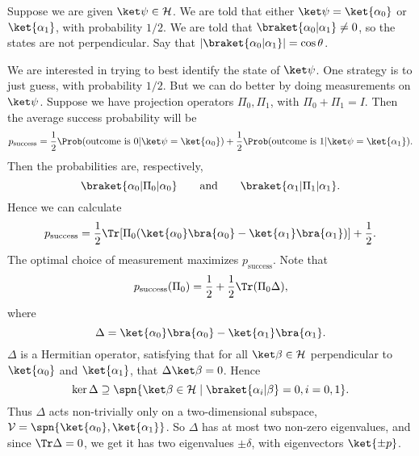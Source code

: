 \documentclass[12pt]{article}
\begin{document}
Suppose we are given $\ket \psi \in \mathcal{H}$. We are told that either $\ket \psi = \ket{\alpha_0}$ or $\ket{\alpha_1}$, with probability $1/2$. We are told that $\braket{\alpha_0|\alpha_1} \neq 0$, so the states are not perpendicular. Say that $|\braket{\alpha_0|\alpha_1}| = \cos \theta$.

We are interested in trying to best identify the state of $\ket \psi$. One strategy is to just guess, with probability $1/2$. But we can do better by doing measurements on $\ket \psi$. Suppose we have projection operators $\Pi_0, \Pi_1$, with $\Pi_0 + \Pi_1 = I$. Then the average success probability will be
\[
	p_{\mathrm{success}} = \frac{1}{2} \Prob(\text{outcome is } 0 | \ket \psi = \ket{\alpha_0}) + \frac{1}{2} \Prob(\text{outcome is } 1 | \ket \psi = \ket{\alpha_1}).
\]
Then the probabilities are, respectively,
\[
	\braket{\alpha_0|\Pi_0|\alpha_0} \qquad \text{and} \qquad \braket{\alpha_1|\Pi_1|\alpha_1}.
\]
Hence we can calculate
\[
	p_{\mathrm{success}} = \frac{1}{2} \Tr[\Pi_0(\ket{\alpha_0} \bra{\alpha_0} - \ket{\alpha_1} \bra{\alpha_1})] + \frac{1}{2}.
\]
The optimal choice of measurement maximizes $p_{\mathrm{success}}$. Note that
\[
p_{\mathrm{success}}(\Pi_0) = \frac{1}{2} + \frac{1}{2} \Tr(\Pi_0 \Delta),
\]
where
\[
	\Delta = \ket{\alpha_0}\bra{\alpha_0} - \ket{\alpha_1}\bra{\alpha_1}.
\]
$\Delta$ is a Hermitian operator, satisfying that for all $\ket \beta \in \mathcal{H}$ perpendicular to $\ket{\alpha_0}$ and $\ket{\alpha_1}$, that $\Delta \ket \beta = 0$. Hence
\[
	\ker \Delta \supseteq \spn\{\ket \beta \in \mathcal{H} \mid \braket{\alpha_i|\beta} = 0, i = 0, 1\}.
\]
Thus $\Delta$ acts non-trivially only on a two-dimensional subspace, $\mathcal{V} = \spn\{\ket{\alpha_0}, \ket{\alpha_1}\}$. So $\Delta$ has at most two non-zero eigenvalues, and since $\Tr \Delta = 0$, we get it has two eigenvalues $\pm \delta$, with eigenvectors $\ket{\pm p}$.

\end{document}
